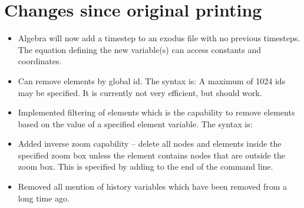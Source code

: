 \section{Changes since original printing}
\begin{itemize}
  \item Algebra will now add a timestep to an exodus file with no previous timesteps.  The equation 
	    defining the new variable(s) can access constants and coordinates.

  \item	Can remove elements by global id. The syntax is:
    A maximum of 1024 ids may be specified. It is currently not very efficient, but should work.

  \item Implemented filtering of elements which is the capability
    to remove elements based on the value of a specified element
    variable.  The syntax is:



\item Added inverse zoom capability -- delete all nodes and
  elements inside the specified zoom box unless the element
  contains nodes that are outside the zoom box. This is
  specified by adding  to the end of the
   command line.

\item Removed all mention of history variables which have been removed from \exo{} a long time ago.
\end{itemize}


